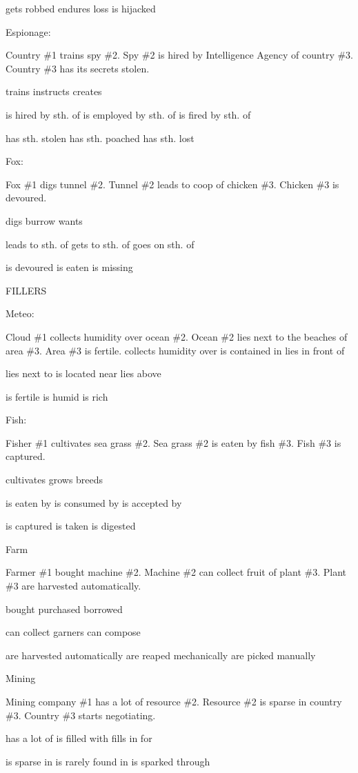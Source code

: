 gets robbed
endures loss
is hijacked


Espionage:

Country \#1 trains spy \#2.
Spy \#2 is hired by Intelligence Agency of country \#3.
Country \#3 has its secrets stolen.

trains
instructs
creates

is hired by sth. of
is employed by sth. of
is fired by sth. of

has sth. stolen
has sth. poached
has sth. lost


Fox:

Fox \#1 digs tunnel \#2.
Tunnel \#2 leads to coop of chicken \#3.
Chicken \#3 is devoured.

digs
burrow
wants

leads to sth. of
gets to sth. of
goes on sth. of

is devoured
is eaten
is missing



FILLERS

Meteo:

Cloud \#1 collects humidity over ocean \#2.
Ocean \#2 lies next to the beaches of area \#3.
Area \#3 is fertile.
collects humidity over
is contained in
lies in front of

lies next to
is located near
lies above

is fertile
is humid
is rich


Fish:

Fisher \#1 cultivates sea grass \#2.
Sea grass \#2 is eaten by fish \#3.
Fish \#3 is captured.

cultivates
grows
breeds

is eaten by
is consumed by
is accepted by

is captured
is taken
is digested


Farm

Farmer \#1 bought machine \#2.
Machine \#2 can collect fruit of plant \#3.
Plant \#3 are harvested automatically.

bought
purchased
borrowed

can collect
garners
can compose

are harvested automatically
are reaped mechanically
are picked manually

Mining

Mining company \#1 has a lot of resource \#2.
Resource \#2 is sparse in country \#3.
Country \#3 starts negotiating.

has a lot of
is filled with
fills in for

is sparse in
is rarely found in
is sparked through

